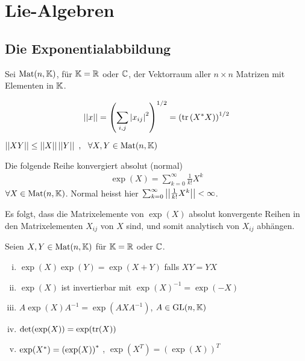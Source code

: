 \section{Lie-Algebren}

\subsection{Die Exponentialabbildung}

Sei $\text{Mat}(n,\mathbb{K})$, für $\mathbb{K} = \mathbb{R}$ oder $\mathbb{C}$, der Vektorraum aller $n \times n$
Matrizen mit Elementen in $\mathbb{K}$.

\begin{definition}[Frobeniusnorm]
    \begin{align*}
        \left\vert\left\vert x \right\vert\right\vert = \left( \sum_{i,j} \left\vert x_{ij} \right\vert^2 \right)^{1/2}
        = \left( \text{tr} \left( X^\ast X \right) \right)^{1/2}
    \end{align*}
\end{definition}

\begin{lemma}
    $\Norm{X Y} \leq \Norm{X} \Norm{Y} \ , \ \ \forall X,Y \in \Mat(n,\K)$
\end{lemma}

\begin{lemma}
    Die folgende Reihe konvergiert absolut (normal)
    \begin{align*}
        \exp(X) = \sum_{k=0}^\infty \frac{1}{k!} X^k
    \end{align*}
    $\forall X \in \text{Mat}(n,\mathbb{K})$.
    Normal heisst hier $\sum_{k=0}^\infty \left\vert\left\vert \frac{1}{k!} X^k \right\vert\right\vert < \infty$.
\end{lemma}

\begin{bemerkung}
    Es folgt, dass die Matrixelemente von $\exp(X)$ absolut konvergente Reihen
    in den Matrixelementen $X_{ij}$ von $X$ sind, und somit analytisch von
    $X_{ij}$ abhängen.
\end{bemerkung}

\begin{lemma}
    Seien $X,Y \in \text{Mat}(n,\mathbb{K})$ für $\mathbb{K} = \mathbb{R}$ oder $\mathbb{C}$.
    \begin{enumerate}[(i)]
        \item $\exp(X) \exp(Y) = \exp(X+Y)$ falls $XY = YX$
        \item $\exp(X)$ ist invertierbar mit $\exp(X)^{-1} = \exp(-X)$
        \item $A \exp(X) A^{-1} = \exp(A X A^{-1})$, $A \in \text{GL}(n,\mathbb{K})$
        \item $\det(\exp(X)) = \exp(\text{tr}(X))$
        \item $\exp(X^\ast) = \left( \exp(X) \right)^\ast$ , $\exp(X^T) = (\exp(X))^T$
    \end{enumerate}
\end{lemma}

